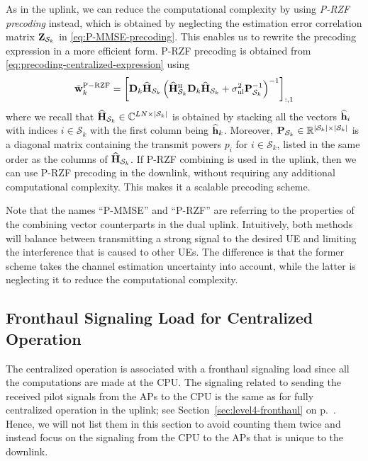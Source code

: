 As in the uplink, we can reduce the computational complexity by using \emph{P-RZF precoding} instead, which is obtained by neglecting the estimation error correlation matrix ${\bf{Z}}_{{\mathcal S}_k} $ in \eqref{eq:P-MMSE-precoding}. This enables us to rewrite the precoding expression in a more efficient form. P-RZF precoding is obtained from \eqref{eq:precoding-centralized-expression} using
\begin{align} 
\bar{\vect{w}}_{k}^{{\rm P-RZF}} =  \left [\vect{{D}}_{k}\vect{\widehat{H}}_{\mathcal{S}_k}\left( \vect{\widehat{H}}^{\Htran}_{\mathcal{S}_k}\vect{{D}}_{k}\vect{\widehat{H}}_{\mathcal{S}_k}+\sigmaUL\vect{{P}}_{\mathcal{S}_k}^{-1} \right)^{-1} \right]_{:,1}  \label{eq:P-RZF-precoding}
\end{align}
where we recall that $\mathbf{\widehat{H}}_{\mathcal{S}_k} \in \mathbb{C}^{LN\times |\mathcal{S}_k|}$ is obtained by stacking all the vectors $\mathbf{\widehat{h}}_i$ with indices $i\in \mathcal{S}_k$ with the first column being $\mathbf{\widehat{h}}_k$. Moreover, $\mathbf{{P}}_{\mathcal{S}_k} \in \mathbb{R}^{|\mathcal{S}_k| \times |\mathcal{S}_k|}$ is a diagonal matrix containing the transmit powers $p_i$ for $i\in \mathcal{S}_k$, listed in the same order as the columns of $\mathbf{\widehat{H}}_{\mathcal{S}_k}$.
If P-RZF combining is used in the uplink, then we can use P-RZF precoding in the downlink, without requiring any additional computational complexity. This makes it a scalable precoding scheme.

Note that the names ``P-MMSE'' and ``P-RZF'' are referring to the properties of the combining vector counterparts in the dual uplink. Intuitively, both methods will balance between transmitting a strong signal to the desired UE and limiting the interference that is caused to other UEs. The difference is that the former scheme takes the channel estimation uncertainty into account, while the latter is neglecting it to reduce the computational complexity. 


\subsection{Fronthaul Signaling Load for Centralized Operation}
\label{sec:level4-fronthaul-downlink}

The centralized operation is associated with a fronthaul signaling load since all the computations are made at the CPU. The signaling related to sending the received pilot signals from the APs to the CPU is the same as for fully centralized operation in the uplink; see Section~\ref{sec:level4-fronthaul} on p.~\pageref{sec:level4-fronthaul}. Hence, we will not list them in this section to avoid counting them twice and instead focus on the signaling from the CPU to the APs that is unique to the downlink.


